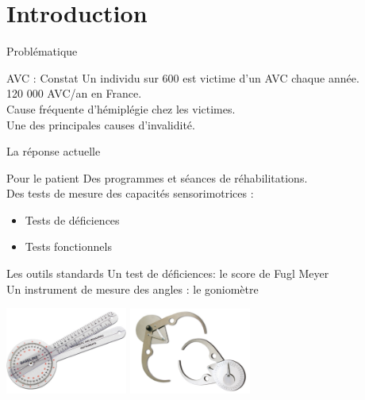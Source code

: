 \section{Introduction}

\begin{frame}
\end{frame}

\begin{frame}{Problématique}
	\begin{alertblock}{AVC : Constat}
		Un individu sur 600 est victime d'un AVC chaque année. \\
		120 000 AVC/an en France. \\ \pause 
		Cause fréquente d'hémiplégie chez les victimes. \\
		Une des principales causes d'invalidité.
	\end{alertblock}
\end{frame}

\begin{frame}{La réponse actuelle}
	\begin{block}{Pour le patient}
	Des programmes et séances de réhabilitations.\\
	Des tests de mesure des capacités sensorimotrices :
		\begin{itemize}
			\item Tests de déficiences
			\item Tests fonctionnels
		\end{itemize}
	\end{block}
\end{frame}

\begin{frame}
	\begin{block}{Les outils standards}
		Un test de déficiences: le score de Fugl Meyer \\
		Un instrument de mesure des angles : le goniomètre
		\end{block}
		\begin{center}
			\includegraphics[width=4cm]{../images/goniometre.jpg}
			\includegraphics[width=4cm]{../images/clockprop.jpg}
	\end{center}
\end{frame}

